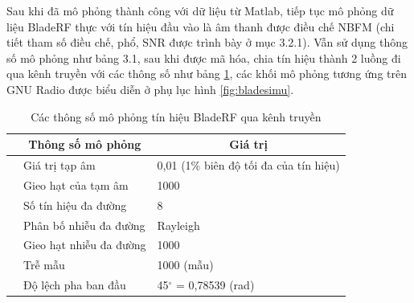 Sau khi đã mô phỏng thành công với dữ liệu từ Matlab, tiếp tục mô phỏng dữ liệu BladeRF thực với tín hiệu đầu vào là âm thanh được điều chế NBFM (chi tiết tham số điều chế, phổ, SNR được trình bày ở mục 3.2.1). Vẫn sử dụng thông số mô phỏng như bảng 3.1, sau khi được mã hóa, chia tín hiệu thành 2 luồng đi qua kênh truyền với các thông số như bảng \ref{tab:simu}, các khối mô phỏng tương ứng trên GNU Radio được biểu diễn ở phụ lục hình \ref{fig:bladesimu}.
\begin{table}[!h]
\centering
\caption{Các thông số mô phỏng tín hiệu BladeRF qua kênh truyền}
\begin{tabular}{|l|l|l|} 
	\hline
	\rowcolor[rgb]{1,0.91,0.906} \multicolumn{1}{|c|}{ \textbf{Mô phỏng} } & \multicolumn{1}{c|}{\textbf{Thông số mô phỏng} } & \multicolumn{1}{c|}{\textbf{Giá trị} }  \\ 
	\hline
	{\cellcolor[rgb]{0.937,0.937,0.937}}                                   & Giá trị tạp âm                                   & 0,01 (1\% biên độ tối đa của tín hiệu)  \\ 
	\hhline{|>{\arrayrulecolor[rgb]{0.937,0.937,0.937}}->{\arrayrulecolor{black}}--|}
	{\cellcolor[rgb]{0.937,0.937,0.937}}                                   & Gieo hạt của tạm âm                              & 1000                                    \\ 
	\hhline{|>{\arrayrulecolor[rgb]{0.937,0.937,0.937}}->{\arrayrulecolor{black}}--|}
	{\cellcolor[rgb]{0.937,0.937,0.937}}                                   & Số tín hiệu đa đường                             & 8                                       \\ 
	\hhline{|>{\arrayrulecolor[rgb]{0.937,0.937,0.937}}->{\arrayrulecolor{black}}--|}
	{\cellcolor[rgb]{0.937,0.937,0.937}}                                   & Phân bố nhiễu đa đường                           & Rayleigh                                \\ 
	\hhline{|>{\arrayrulecolor[rgb]{0.937,0.937,0.937}}->{\arrayrulecolor{black}}--|}
	\multirow{-5}{*}{{\cellcolor[rgb]{0.937,0.937,0.937}}Kênh truyền}      & Gieo hạt nhiễu đa đường                          & 1000                                    \\ 
	\hline
	{\cellcolor[rgb]{1,0.988,0.62}}                                        & Trễ mẫu                                          & 1000 (mẫu)                              \\ 
	\hhline{|>{\arrayrulecolor[rgb]{1,0.988,0.62}}->{\arrayrulecolor{black}}--|}
	\multirow{-2}{*}{{\cellcolor[rgb]{1,0.988,0.62}}Phần cứng BladeRF}     & Độ lệch pha ban đầu                              & 45$^{\circ}$ = 0,78539 (rad)            \\
	\hline
\end{tabular}
\label{tab:simu}
\end{table}

